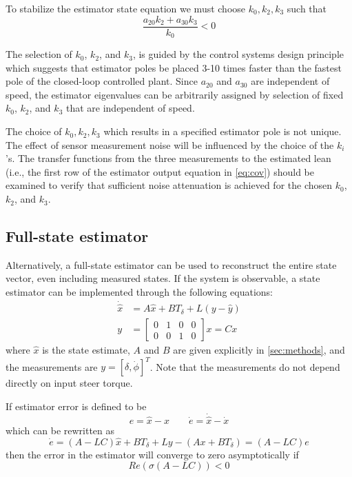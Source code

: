 \documentclass[letterpaper,11pt]{article}
\begin{document}
To stabilize the estimator state equation we must choose $k_0, k_2, k_3$ such
that
\begin{equation*}
\frac{a_{20} k_{2} + a_{30} k_{3}}{k_{0}} < 0
\end{equation*}

The selection of $k_0$, $k_2$, and $k_3$, is guided by the control systems
design principle which suggests that estimator poles be placed 3-10 times faster
than the fastest pole of the closed-loop controlled plant. Since $a_{20}$ and $a_{30}$ are
independent of speed, the estimator eigenvalues can be arbitrarily assigned by
selection of fixed $k_0$, $k_2$, and $k_3$ that are independent of speed.

The choice of $k_0, k_2, k_3$ which results in a specified estimator pole is
not unique. The effect of sensor measurement noise will be influenced by the
choice of the $k_i$'s. The transfer functions from the three measurements to
the estimated lean (i.e., the first row of the estimator output equation in
\autoref{eq:cov}) should be examined to verify that sufficient noise
attenuation is achieved for the chosen $k_0$, $k_2$, and $k_3$.

\subsection{Full-state estimator} \label{fullstate}
Alternatively, a full-state estimator can be used to reconstruct the entire
state vector, even including measured states. If the system is observable, a state
estimator can be implemented through the following equations:
\begin{align*}
\dot{\hat{x}} &= A \hat{x} + B T_\delta + L \left(y - \hat{y}\right) \\
y &= \left[\begin{smallmatrix}0 & 1 & 0 & 0\\0 & 0 & 1 & 0\end{smallmatrix}\right] x = C x
\end{align*}
where $\hat{x}$ is the state estimate, $A$ and $B$ are given explicitly in
\autoref{sec:methods}, and the measurements are $y = \left[\delta,
\dot{\phi}\right]^T$.  Note that the measurements do not depend directly on
input steer torque.

If estimator error is defined to be
\begin{equation*}
e = \hat{x} - x
\qquad
\dot{e} = \dot{\hat{x}} - \dot{x}
\end{equation*}
which can be rewritten as
\begin{equation*}
\dot{e} = \left(A - LC\right) \hat{x} + B T_\delta + L y - \left(A x + B T_\delta\right)
= \left(A - LC\right) e
\end{equation*}
then the error in the estimator will converge to zero asymptotically if
\begin{equation*}
Re\left(\sigma\left(A - LC\right)\right) < 0
\end{equation*}
\end{document}
